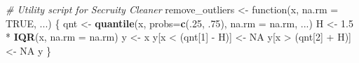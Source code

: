 \documentclass[]{elsarticle} %
\newenvironment{Shaded}{\begin{snugshade}}{\end{snugshade}}
\newcommand{\KeywordTok}[1]{\textcolor[rgb]{0.13,0.29,0.53}{\textbf{{#1}}}}
\newcommand{\DataTypeTok}[1]{\textcolor[rgb]{0.13,0.29,0.53}{{#1}}}
\newcommand{\DecValTok}[1]{\textcolor[rgb]{0.00,0.00,0.81}{{#1}}}
\newcommand{\FloatTok}[1]{\textcolor[rgb]{0.00,0.00,0.81}{{#1}}}
\newcommand{\StringTok}[1]{\textcolor[rgb]{0.31,0.60,0.02}{{#1}}}
\newcommand{\CommentTok}[1]{\textcolor[rgb]{0.56,0.35,0.01}{\textit{{#1}}}}
\newcommand{\OtherTok}[1]{\textcolor[rgb]{0.56,0.35,0.01}{{#1}}}
\newcommand{\NormalTok}[1]{{#1}}
\begin{document}
\begin{Shaded}
\begin{Highlighting}[]
\CommentTok{# Utility script for Secruity Cleaner }
\NormalTok{remove_outliers <-}\StringTok{ }\NormalTok{function(x, }\DataTypeTok{na.rm =} \OtherTok{TRUE}\NormalTok{, ...) \{}
  \NormalTok{qnt <-}\StringTok{ }\KeywordTok{quantile}\NormalTok{(x, }\DataTypeTok{probs=}\KeywordTok{c}\NormalTok{(.}\DecValTok{25}\NormalTok{, .}\DecValTok{75}\NormalTok{), }\DataTypeTok{na.rm =} \NormalTok{na.rm, ...)}
  \NormalTok{H <-}\StringTok{ }\FloatTok{1.5} \NormalTok{*}\StringTok{ }\KeywordTok{IQR}\NormalTok{(x, }\DataTypeTok{na.rm =} \NormalTok{na.rm)}
  \NormalTok{y <-}\StringTok{ }\NormalTok{x}
  \NormalTok{y[x <}\StringTok{ }\NormalTok{(qnt[}\DecValTok{1}\NormalTok{] -}\StringTok{ }\NormalTok{H)] <-}\StringTok{ }\OtherTok{NA}
  \NormalTok{y[x >}\StringTok{ }\NormalTok{(qnt[}\DecValTok{2}\NormalTok{] +}\StringTok{ }\NormalTok{H)] <-}\StringTok{ }\OtherTok{NA}
  \NormalTok{y}
\NormalTok{\}}
\end{Highlighting}
\end{Shaded}
\end{document}
